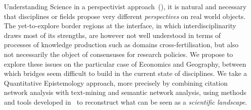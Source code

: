 \documentclass[11pt]{article}
\begin{document}
Understanding Science in a perspectivist approach~(\cite{giere2010scientific}), it is natural and necessary that disciplines or fields propose very different \emph{perspectives} on real world objects. The yet-to-explore border regions at the interface, in which interdisciplinarity draws most of its strengths, are however not well understood in terms of processes of knowledge production such as domains cross-fertilisation, but also not necessarily the object of consensuses for research policies. We propose to explore these issues on the particular case of Economics and Geography, between which bridges seem difficult to build in the current state of disciplines. We take a Quantitative Epistemology approach, more precisely by combining citation network analysis with text-mining and semantic network analysis, using methods and tools developed in~\cite{raimbault2016indirect} to reconstruct what can be seen as a \emph{scientific landscape}. %
\end{document}
